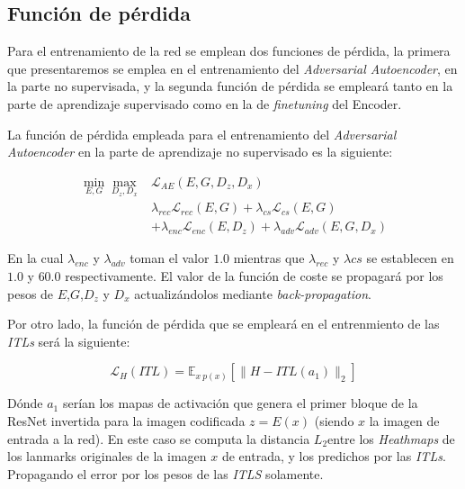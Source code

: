             \subsection{Función de pérdida}

                \noindent Para el entrenamiento de la red se emplean dos funciones de pérdida, la primera que presentaremos se emplea en el entrenamiento del \textit{Adversarial Autoencoder}, en la parte no supervisada, y la segunda función de pérdida se empleará tanto en la parte de aprendizaje supervisado como en la de \textit{finetuning} del Encoder.
        
                \medskip
        
                \noindent La función de pérdida empleada para el entrenamiento del \textit{Adversarial Autoencoder} en la parte de aprendizaje no supervisado es la siguiente: 
                
                \begin{align*}
                    \min_{E,G} \max_{D_z,D_x} & \mathcal{L}_{AE}(E,G,D_z,D_x) \\
                    & \lambda_{rec} \mathcal{L}_{rec}(E,G) + \lambda_{cs}\mathcal{L}_{cs}(E,G) \\
                    & + \lambda_{enc}\mathcal{L}_{enc}(E,D_z)+ \lambda_{adv} \mathcal{L}_{adv}(E,G,D_x)
                \end{align*}

                \noindent En la cual $\lambda_{enc}$ y $\lambda_{adv}$ toman el valor $1.0$ mientras que $\lambda_{rec}$ y $\lambda{cs}$ se establecen en $1.0$ y $60.0$ respectivamente. El valor de la función de coste se propagará por los pesos de $E$,$G$,$D_z$ y $D_x$ actualizándolos mediante \textit{back-propagation}.

                \medskip

                \noindent Por otro lado, la función de pérdida que se empleará en el entrenmiento de las \textit{ITLs} será la siguiente: 

                \begin{equation*}
                    \mathcal{L}_H(ITL) = \mathbb{E}_{x ~ p(x)} \left[ \| H-ITL(a_1)\|_2 \right]
                \end{equation*}

                \noindent Dónde $a_1$ serían los mapas de activación que genera el primer bloque de la ResNet invertida para la imagen codificada $z=E(x)$ (siendo $x$ la imagen de entrada a la red). En este caso se computa la distancia \textbf{$L_2$}entre los \textit{Heathmaps} de los lanmarks originales de la imagen $x$ de entrada, y los predichos por las \textit{ITLs}. Propagando el error por los pesos de las \textit{ITLS} solamente.

